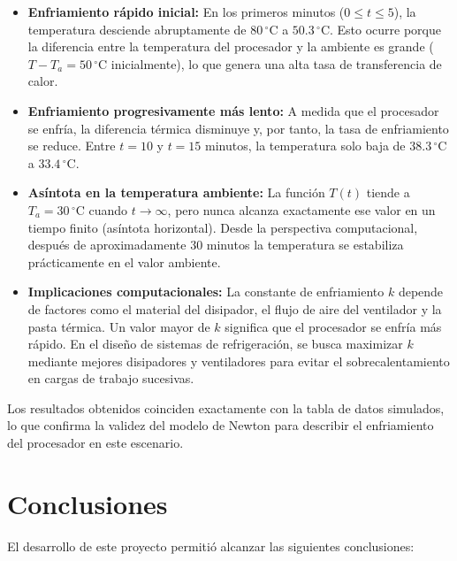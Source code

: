\documentclass[12pt,a4paper]{article}
\begin{document}
\begin{itemize}
  \item \textbf{Enfriamiento rápido inicial:} En los primeros minutos (\(0 \leq t \leq 5\)), la temperatura desciende abruptamente de \(80\,^{\circ}\mathrm{C}\) a \(50.3\,^{\circ}\mathrm{C}\). Esto ocurre porque la diferencia entre la temperatura del procesador y la ambiente es grande (\(T - T_a = 50\,^{\circ}\mathrm{C}\) inicialmente), lo que genera una alta tasa de transferencia de calor.

  \item \textbf{Enfriamiento progresivamente más lento:} A medida que el procesador se enfría, la diferencia térmica disminuye y, por tanto, la tasa de enfriamiento se reduce. Entre \(t=10\) y \(t=15\) minutos, la temperatura solo baja de \(38.3\,^{\circ}\mathrm{C}\) a \(33.4\,^{\circ}\mathrm{C}\).

  \item \textbf{Asíntota en la temperatura ambiente:} La función \(T(t)\) tiende a \(T_a = 30\,^{\circ}\mathrm{C}\) cuando \(t \to \infty\), pero nunca alcanza exactamente ese valor en un tiempo finito (asíntota horizontal). Desde la perspectiva computacional, después de aproximadamente 30 minutos la temperatura se estabiliza prácticamente en el valor ambiente.

  \item \textbf{Implicaciones computacionales:} La constante de enfriamiento \(k\) depende de factores como el material del disipador, el flujo de aire del ventilador y la pasta térmica. Un valor mayor de \(k\) significa que el procesador se enfría más rápido. En el diseño de sistemas de refrigeración, se busca maximizar \(k\) mediante mejores disipadores y ventiladores para evitar el sobrecalentamiento en cargas de trabajo sucesivas.
\end{itemize}

Los resultados obtenidos coinciden exactamente con la tabla de datos simulados, lo que confirma la validez del modelo de Newton para describir el enfriamiento del procesador en este escenario.

\section{Conclusiones}

El desarrollo de este proyecto permitió alcanzar las siguientes conclusiones:
\end{document}
